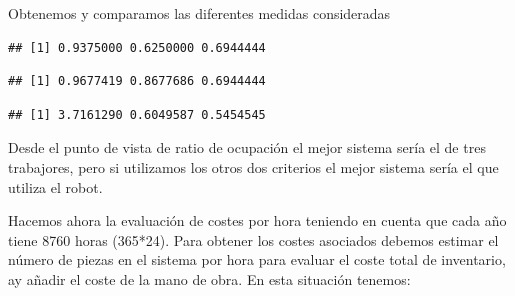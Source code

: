 \documentclass[
]{book}
\newenvironment{Shaded}{\begin{snugshade}}{\end{snugshade}}
\newcommand{\CommentTok}[1]{\textcolor[rgb]{0.56,0.35,0.01}{\textit{#1}}}
\newcommand{\DecValTok}[1]{\textcolor[rgb]{0.00,0.00,0.81}{#1}}
\newcommand{\FunctionTok}[1]{\textcolor[rgb]{0.00,0.00,0.00}{#1}}
\newcommand{\NormalTok}[1]{#1}
\newcommand{\SpecialCharTok}[1]{\textcolor[rgb]{0.00,0.00,0.00}{#1}}
\theoremstyle{definition}
\theoremstyle{definition}
\theoremstyle{definition}
\theoremstyle{definition}
\theoremstyle{remark}
\begin{document}
Obtenemos y comparamos las diferentes medidas consideradas

\begin{Shaded}
\end{Shaded}

\begin{verbatim}
## [1] 0.9375000 0.6250000 0.6944444
\end{verbatim}

\begin{Shaded}
\end{Shaded}

\begin{verbatim}
## [1] 0.9677419 0.8677686 0.6944444
\end{verbatim}

\begin{Shaded}
\end{Shaded}

\begin{verbatim}
## [1] 3.7161290 0.6049587 0.5454545
\end{verbatim}

Desde el punto de vista de ratio de ocupación el mejor sistema sería el de tres trabajores, pero si utilizamos los otros dos criterios el mejor sistema sería el que utiliza el robot.

Hacemos ahora la evaluación de costes por hora teniendo en cuenta que cada año tiene 8760 horas (365*24). Para obtener los costes asociados debemos estimar el número de piezas en el sistema por hora para evaluar el coste total de inventario, ay añadir el coste de la mano de obra. En esta situación tenemos:
\end{document}

